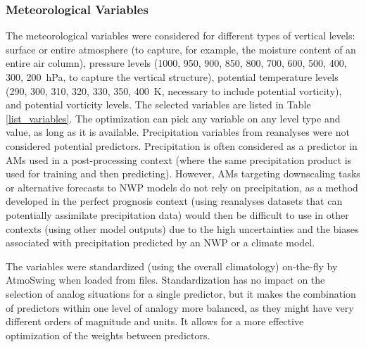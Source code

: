 \documentclass[draft]{agujournal2019}
\begin{document}
\subsubsection{Meteorological Variables}
\label{variables}

The meteorological variables were considered for different types of vertical levels: surface or entire atmosphere (to capture, for example, the moisture content of an entire air column), pressure levels (1000, 950, 900, 850, 800, 700, 600, 500, 400, 300, 200~hPa, to capture the vertical structure), potential temperature levels (290, 300, 310, 320, 330, 350, 400~K, necessary to include potential vorticity), and potential vorticity levels. The selected variables are listed in Table \ref{list_variables}. The optimization can pick any variable on any level type and value, as long as it is available. Precipitation variables from reanalyses were not considered potential predictors. Precipitation is often considered as a predictor in AMs used in a post-processing context (where the same precipitation product is used for training and then predicting). However, AMs targeting downscaling tasks or alternative forecasts to NWP models do not rely on precipitation, as a method developed in the perfect prognosis context (using reanalyses datasets that can potentially assimilate precipitation data) would then be difficult to use in other contexts (using other model outputs) due to the high uncertainties and the biases associated with precipitation predicted by an NWP or a climate model.

The variables were standardized (using the overall climatology) on-the-fly by AtmoSwing when loaded from files. Standardization has no impact on the selection of analog situations for a single predictor, but it makes the combination of predictors within one level of analogy more balanced, as they might have very different orders of magnitude and units. It allows for a more effective optimization of the weights between predictors.
\end{document}
